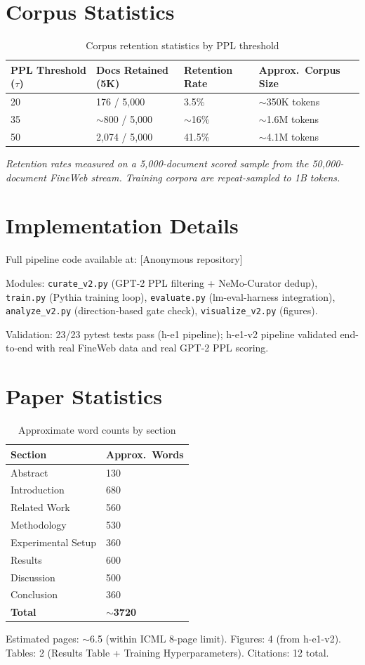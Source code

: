 \appendix

\section{Corpus Statistics}

\begin{table}[h]
\centering
\caption{Corpus retention statistics by PPL threshold}
\label{tab:corpus}
\begin{tabular}{llll}
\toprule
\textbf{PPL Threshold ($\tau$)} & \textbf{Docs Retained (5K)} & \textbf{Retention Rate} & \textbf{Approx.\ Corpus Size} \\
\midrule
20 & 176 / 5,000 & 3.5\% & $\sim$350K tokens \\
35 & $\sim$800 / 5,000 & $\sim$16\% & $\sim$1.6M tokens \\
50 & 2,074 / 5,000 & 41.5\% & $\sim$4.1M tokens \\
\bottomrule
\end{tabular}
\end{table}

\textit{Retention rates measured on a 5,000-document scored sample from the 50,000-document FineWeb stream. Training corpora are repeat-sampled to 1B tokens.}

\section{Implementation Details}

Full pipeline code available at: [Anonymous repository]

Modules: \texttt{curate\_v2.py} (GPT-2 PPL filtering + NeMo-Curator dedup), \texttt{train.py} (Pythia training loop), \texttt{evaluate.py} (lm-eval-harness integration), \texttt{analyze\_v2.py} (direction-based gate check), \texttt{visualize\_v2.py} (figures).

Validation: 23/23 pytest tests pass (h-e1 pipeline); h-e1-v2 pipeline validated end-to-end with real FineWeb data and real GPT-2 PPL scoring.

\section{Paper Statistics}

\begin{table}[h]
\centering
\caption{Approximate word counts by section}
\label{tab:wordcount}
\begin{tabular}{ll}
\toprule
\textbf{Section} & \textbf{Approx.\ Words} \\
\midrule
Abstract & 130 \\
Introduction & 680 \\
Related Work & 560 \\
Methodology & 530 \\
Experimental Setup & 360 \\
Results & 600 \\
Discussion & 500 \\
Conclusion & 360 \\
\midrule
\textbf{Total} & \textbf{$\sim$3720} \\
\bottomrule
\end{tabular}
\end{table}

Estimated pages: $\sim$6.5 (within ICML 8-page limit).
Figures: 4 (from h-e1-v2).
Tables: 2 (Results Table + Training Hyperparameters).
Citations: 12 total.
